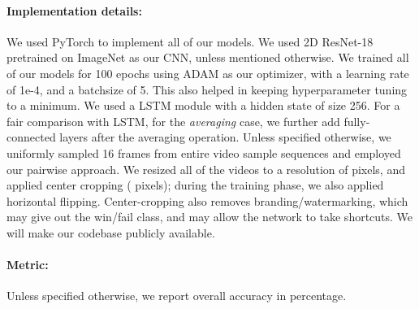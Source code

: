 \documentclass[final]{cvpr}
\begin{document}
\paragraph{Implementation details:} We used PyTorch \cite{pytorch} to implement all of our models. We used 2D ResNet-18 \cite{resnet} pretrained on ImageNet \cite{imagenet} as our CNN, unless mentioned otherwise. We trained all of our models for 100 epochs using ADAM \cite{adam} as our optimizer, with a learning rate of 1e-4, and a batchsize of 5. This also helped in keeping hyperparameter tuning to a minimum. We used a LSTM module with a hidden state of size 256. For a fair comparison with LSTM, for the \textit{averaging} case, we further add fully-connected layers after the averaging operation. Unless specified otherwise, we uniformly sampled 16 frames from entire video sample sequences and employed our pairwise approach. We resized all of the videos to a resolution of  pixels, and applied center cropping ( pixels); during the training phase, we also applied horizontal flipping. Center-cropping also removes branding/watermarking, which may give out the win/fail class, and may allow the network to take shortcuts. We will make our codebase publicly available.
\paragraph{Metric:} Unless specified otherwise, we report overall accuracy in percentage.
\end{document}
